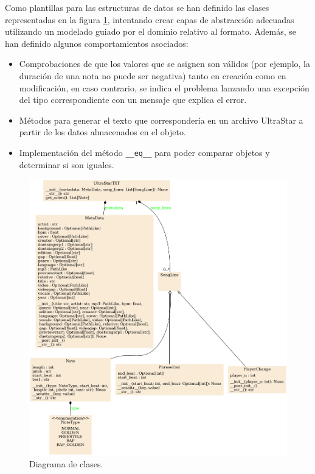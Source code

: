 Como plantillas para las estructuras de datos se han definido las clases representadas en la figura \ref{fig:class1}, intentando crear capas de abstracción adecuadas utilizando un modelado guiado por el dominio relativo al formato. Además, se han definido algunos comportamientos asociados:
\begin{itemize}
	\item{Comprobaciones de que los valores que se asignen son válidos (por ejemplo, la duración de una nota no puede ser negativa) tanto en creación como en modificación, en caso contrario, se indica el problema lanzando una excepción del tipo correspondiente con un mensaje que explica el error.}
	\item{Métodos para generar el texto que correspondería en un archivo UltraStar a partir de los datos almacenados en el objeto.}
	\item{Implementación del método \texttt{\_\_eq\_\_} para poder comparar objetos  y determinar si son iguales.}
\end{itemize}

\begin{figure}[H]
	\includegraphics[width=\linewidth]{logos/classes.png}
	\caption{Diagrama de clases.}
	\label{fig:class1}
\end{figure}

